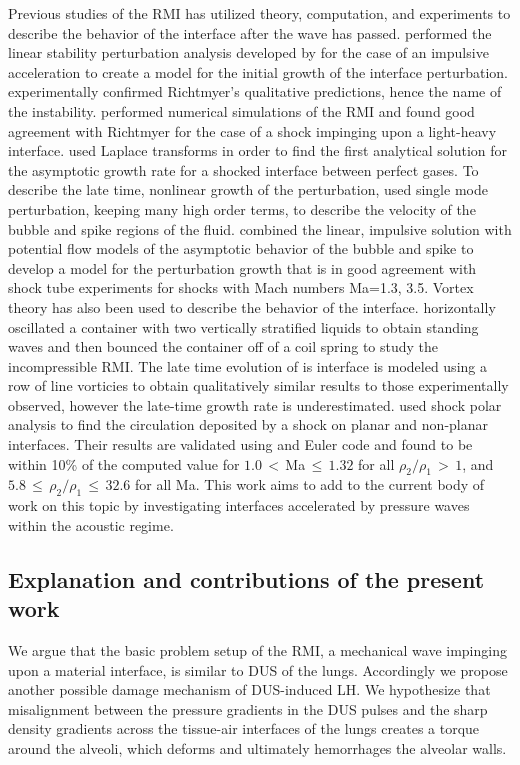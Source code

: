 Previous studies of the \ac{RMI} has utilized theory, computation, and
experiments to describe the behavior of the interface after the wave
has passed. \cite{Richtmyer1960} performed the linear stability
perturbation analysis developed by \cite{Taylor1950} for the case of
an impulsive acceleration to create a model for the initial growth of
the interface perturbation. \cite{Meshkov1969} experimentally
confirmed Richtmyer's qualitative predictions, hence the name of the
instability. \cite{Meyer1972} performed numerical simulations of the
\ac{RMI} and found good agreement with Richtmyer for the case of a
shock impinging upon a light-heavy interface. \cite{Fraley1986} used
Laplace transforms in order to find the first analytical solution for
the asymptotic growth rate for a shocked interface between perfect
gases. To describe the late time, nonlinear growth of the
perturbation, \cite{Zhang1997} used single mode perturbation, keeping
many high order terms, to describe the velocity of the bubble and
spike regions of the fluid. \cite{Sadot1998} combined the linear,
impulsive solution with potential flow models of the asymptotic
behavior of the bubble and spike to develop a model for the
perturbation growth that is in good agreement with shock tube
experiments for shocks with Mach numbers Ma=1.3, 3.5. Vortex theory
has also been used to describe the behavior of the
interface. \cite{Jacobs1996} horizontally oscillated a container with
two vertically stratified liquids to obtain standing waves and then
bounced the container off of a coil spring to study the incompressible
\ac{RMI}. The late time evolution of is interface is modeled using a
row of line vorticies to obtain qualitatively similar results to those
experimentally observed, however the late-time growth rate is
underestimated. \cite{Samtaney1994} used shock polar analysis to find
the circulation deposited by a shock on planar and non-planar
interfaces. Their results are validated using and Euler code and found
to be within 10\% of the computed value for $1.0\,<\,$Ma$\,\leq\,1.32$
for all $\rho_2/\rho_1\,>\,1$, and
$5.8\,\leq\,\rho_2/\rho_1\,\leq\,32.6$ for all Ma. This work aims to
add to the current body of work on this topic by investigating
interfaces accelerated by pressure waves within the acoustic regime.

\subsection{Explanation and contributions of the present work}
\label{subsec:usbe_lung_contribution_intro}
We argue that the basic problem setup of the \ac{RMI}, a mechanical
wave impinging upon a material interface, is similar to \ac{DUS} of
the lungs. Accordingly we propose another possible damage mechanism of
\ac{DUS}-induced \ac{LH}. We hypothesize that misalignment between the
pressure gradients in the \ac{DUS} pulses and the sharp density gradients
across the    tissue-air interfaces of the lungs creates a torque around
the alveoli, which deforms and ultimately hemorrhages the alveolar
walls.

